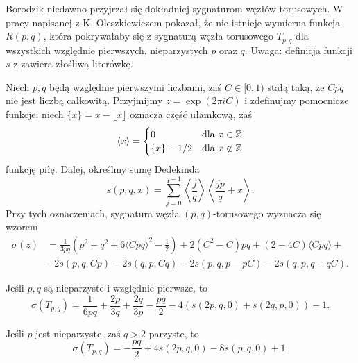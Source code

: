 Borodzik niedawno przyjrzał się dokładniej sygnaturom węzłów torusowych.
W pracy \cite{borodzik10} napisanej z K. Oleszkiewiczem pokazał, że nie istnieje wymierna funkcja $R(p, q)$, która pokrywałaby się z sygnaturą węzła torusowego $T_{p, q}$ dla wszystkich względnie pierwszych, nieparzystych $p$ oraz $q$.
Uwaga: definicja funkcji $s$ z \cite{borodzik10} zawiera złośliwą literówkę.

\begin{proposition}
    Niech $p, q$ będą względnie pierwszymi liczbami, zaś $C \in [0, 1)$ stałą taką, że $Cpq$ nie jest liczbą całkowitą.
    Przyjmijmy $z = \exp (2 \pi i C)$ i zdefinujmy pomocnicze funkcje: niech $\{x\} = x - \lfloor x \rfloor$ oznacza część ułamkową, zaś
    \begin{equation}
        \langle x \rangle = \begin{cases}
            0 & \text{dla } x \in \mathbb Z \\
            \{x\} - 1/2 & \text{dla } x \not \in \mathbb Z
        \end{cases}
    \end{equation}
    funkcję piłę.
    Dalej, określmy sumę Dedekinda
    \begin{equation}
        s(p, q, x) = \sum_{j = 0}^{q-1} \left\langle \frac {j}{q} \right\rangle \left\langle \frac {jp}{q} + x \right\rangle.
    \end{equation}
    Przy tych oznaczeniach, sygnatura węzła $(p, q)$-torusowego wyznacza się wzorem
    \begin{align}
        \sigma(z) & = \frac{1}{3pq} \left (p^2 + q^2 + 6 \langle Cpq \rangle^2 - \frac {1}{2} \right)  + 2(C^2 - C) pq + (2-4C) \langle Cpq \rangle + {} \\
        & - 2s(p, q, Cp) - 2s(q, p, Cq) - 2s(p, q, p-pC) - 2s(q, p, q-qC). \nonumber
    \end{align}
\end{proposition}

\begin{corollary}
    Jeśli $p, q$ są nieparzyste i względnie pierwsze, to
    \begin{equation}
        \sigma(T_{p,q}) = \frac{1}{6pq} + \frac{2p}{3q} + \frac{2q}{3p} - \frac{pq}{2} - 4(s(2p, q, 0) + s(2q, p, 0)) - 1.
    \end{equation}
\end{corollary}

\begin{corollary}
    Jeśli $p$ jest nieparzyste, zaś $q > 2$ parzyste, to
    \begin{equation}
        \sigma(T_{p,q}) = - \frac{pq}{2} + 4s(2p, q, 0) - 8s(p, q, 0) + 1.
    \end{equation}
\end{corollary}

